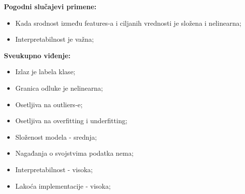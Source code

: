 \documentclass[fontsize=12bp, paper=a4]{scrarticle}
\begin{document}
\textbf{Pogodni slučajevi primene:}
\begin{itemize}
    \item Kada srodnost između features-a i ciljanih vrednosti je složena i nelinearna;
    \item Interpretabilnost je važna;
\end{itemize}

\textbf{Sveukupno viđenje:}
\begin{itemize}
    \item Izlaz je labela klase;
    \item Granica odluke je nelinearna;
    \item Osetljiva na outliers-e;
    \item Osetljiva na overfitting i underfitting;
    \item Složenost modela - srednja;
    \item Nagađanja o svojstvima podatka nema;
    \item Interpretabilnost - visoka;
    \item Lakoća implementacije - visoka;
\end{itemize}




\end{document}
